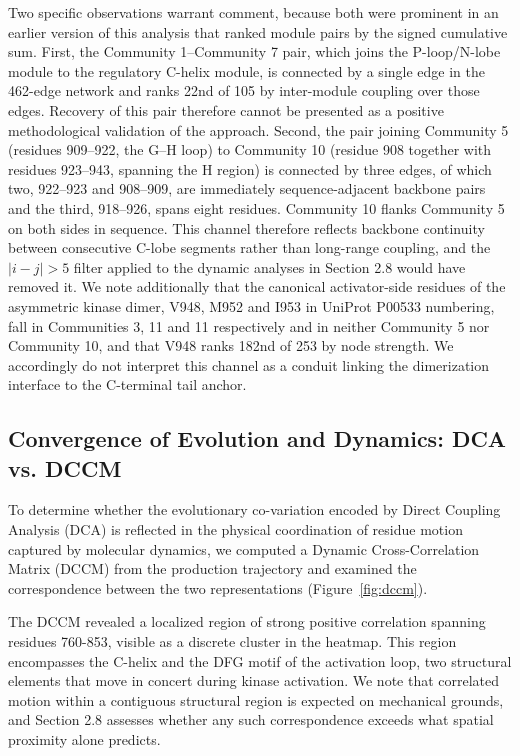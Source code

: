 \documentclass[utf8]{FrontiersinHarvard}
\begin{document}
Two specific observations warrant comment, because both were prominent in an earlier version of this analysis that ranked module pairs by the signed cumulative sum. First, the Community 1--Community 7 pair, which joins the P-loop/N-lobe module to the regulatory \textalpha{}C-helix module, is connected by a single edge in the 462-edge network and ranks 22nd of 105 by inter-module coupling over those edges. Recovery of this pair therefore cannot be presented as a positive methodological validation of the approach. Second, the pair joining Community 5 (residues 909--922, the \textalpha{}G--\textalpha{}H loop) to Community 10 (residue 908 together with residues 923--943, spanning the \textalpha{}H region) is connected by three edges, of which two, 922--923 and 908--909, are immediately sequence-adjacent backbone pairs and the third, 918--926, spans eight residues. Community 10 flanks Community 5 on both sides in sequence. This channel therefore reflects backbone continuity between consecutive C-lobe segments rather than long-range coupling, and the $|i-j|>5$ filter applied to the dynamic analyses in Section 2.8 would have removed it. We note additionally that the canonical activator-side residues of the asymmetric kinase dimer, V948, M952 and I953 in UniProt P00533 numbering, fall in Communities 3, 11 and 11 respectively and in neither Community 5 nor Community 10, and that V948 ranks 182nd of 253 by node strength. We accordingly do not interpret this channel as a conduit linking the dimerization interface to the C-terminal tail anchor.

\subsection{Convergence of Evolution and Dynamics: DCA vs. DCCM}

To determine whether the evolutionary co-variation encoded by Direct Coupling Analysis (DCA) is reflected in the physical coordination of residue motion captured by molecular dynamics, we computed a Dynamic Cross-Correlation Matrix (DCCM) from the production trajectory and examined the correspondence between the two representations (Figure~\ref{fig:dccm}).

The DCCM revealed a localized region of strong positive correlation spanning residues 760-853, visible as a discrete cluster in the heatmap. This region encompasses the \textalpha{}C-helix and the DFG motif of the activation loop, two structural elements that move in concert during kinase activation. We note that correlated motion within a contiguous structural region is expected on mechanical grounds, and Section 2.8 assesses whether any such correspondence exceeds what spatial proximity alone predicts.
\end{document}

